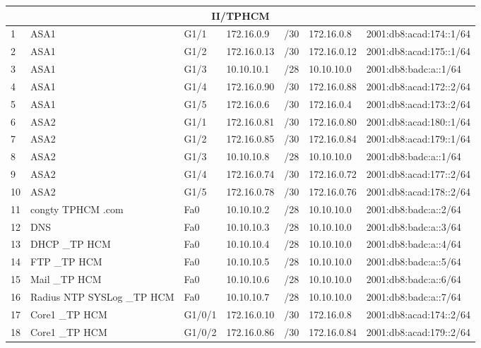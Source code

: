 \documentclass[12pt,a4paper]{report}
\begin{document}
\begin{center}
\begin{longtable}{|p{}|p{}|p{}|p{}|p{}|p{}|p{}|}
        \hline  \multicolumn{7}{|c|}{II/TPHCM} \\
        \hline  1  &  ASA1  &  G1/1  &  172.16.0.9  &  /30  &  172.16.0.8  &  2001:db8:acad:174::1/64 \\
\hline  2  &  ASA1  &  G1/2  &  172.16.0.13  &  /30  &  172.16.0.12  &  2001:db8:acad:175::1/64 \\
\hline  3  &  ASA1  &  G1/3  &  10.10.10.1  &  /28  &  10.10.10.0  &  2001:db8:badc:a::1/64 \\
\hline  4  &  ASA1  &  G1/4  &  172.16.0.90  &  /30  &  172.16.0.88  &  2001:db8:acad:172::2/64 \\
\hline  5  &  ASA1  &  G1/5  &  172.16.0.6  &  /30  &  172.16.0.4  &  2001:db8:acad:173::2/64 \\
\hline  6  &  ASA2  &  G1/1  &  172.16.0.81  &  /30  &  172.16.0.80  &  2001:db8:acad:180::1/64 \\
\hline  7  &  ASA2  &  G1/2  &  172.16.0.85  &  /30  &  172.16.0.84  &  2001:db8:acad:179::1/64 \\
\hline  8  &  ASA2  &  G1/3  &  10.10.10.8  &  /28  &  10.10.10.0  &  2001:db8:badc:a::1/64 \\
\hline  9  &  ASA2  &  G1/4  &  172.16.0.74  &  /30  &  172.16.0.72  &  2001:db8:acad:177::2/64 \\
\hline  10  &  ASA2  &  G1/5  &  172.16.0.78  &  /30  &  172.16.0.76  &  2001:db8:acad:178::2/64 \\
\hline  11  &  congty TPHCM .com  &  Fa0  &  10.10.10.2  &  /28  &  10.10.10.0  &  2001:db8:badc:a::2/64 \\
\hline  12  &  DNS  &  Fa0  &  10.10.10.3  &  /28  &  10.10.10.0  &  2001:db8:badc:a::3/64 \\
\hline  13  &  DHCP \_TP HCM  &  Fa0  &  10.10.10.4  &  /28  &  10.10.10.0  &  2001:db8:badc:a::4/64 \\
\hline  14  &  FTP \_TP HCM  &  Fa0  &  10.10.10.5  &  /28  &  10.10.10.0  &  2001:db8:badc:a::5/64 \\
\hline  15  &  Mail \_TP HCM  &  Fa0  &  10.10.10.6  &  /28  &  10.10.10.0  &  2001:db8:badc:a::6/64 \\
\hline  16  &  Radius NTP SYSLog \_TP HCM  &  Fa0  &  10.10.10.7  &  /28  &  10.10.10.0  &  2001:db8:badc:a::7/64 \\
\hline  17  &  Core1 \_TP HCM  &  G1/0/1  &  172.16.0.10  &  /30  &  172.16.0.8  &  2001:db8:acad:174::2/64 \\
\hline  18  &  Core1 \_TP HCM  &  G1/0/2  &  172.16.0.86  &  /30  &  172.16.0.84  &  2001:db8:acad:179::2/64 \\

\end{longtable}
\end{center}
\end{document}

